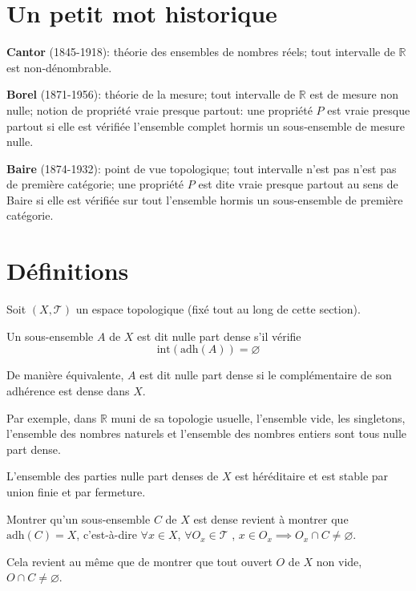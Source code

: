 \section{Un petit mot historique}
\textbf{Cantor} (1845-1918): théorie des ensembles de nombres réels;
tout intervalle de $\mathbb{R}$ est non-dénombrable.

\textbf{Borel} (1871-1956): théorie de la mesure; tout intervalle
de $\mathbb{R}$ est de mesure non nulle; notion de propriété vraie
presque partout: une propriété $P$ est vraie presque partout si
elle est vérifiée l'ensemble complet hormis un sous-ensemble de mesure
nulle.

\textbf{Baire} (1874-1932): point de vue topologique; tout intervalle
n'est pas n'est pas de première catégorie; une propriété $P$ est dite
vraie presque partout au sens de Baire si elle est vérifiée sur tout
l'ensemble hormis un sous-ensemble de première catégorie.

\section{Définitions}

Soit $(X, \mathcal{T})$ un espace topologique (fixé tout au long de cette
section).

\begin{df}
  Un sous-ensemble $A$ de $X$ est dit nulle part dense s'il vérifie
  $$\mathrm{int}\left(\mathrm{adh}(A)\right) = \varnothing$$

  De manière équivalente, $A$ est dit nulle part dense si le complémentaire
  de son adhérence est dense dans $X$.
\end{df}

Par exemple, dans $\mathbb{R}$ muni de sa topologie usuelle, l'ensemble
vide, les singletons, l'ensemble des nombres naturels et l'ensemble des
nombres entiers sont tous nulle part dense.

\begin{prop}
  L'ensemble des parties nulle part denses de $X$ est héréditaire et
  est stable par union finie  et par fermeture.
\end{prop}

\begin{rem}
  Montrer qu'un sous-ensemble $C$ de $X$ est dense revient à
  montrer que $\mathrm{adh}(C) = X$, c'est-à-dire
  $\forall x\in X$, $\forall O_x\in\mathcal{T}$ , $x\in O_x\implies O_x\cap C\neq
  \varnothing$.

  Cela revient au même que de montrer que tout ouvert $O$ de $X$ non vide,
  $O\cap C\neq \varnothing$.
\end{rem}

